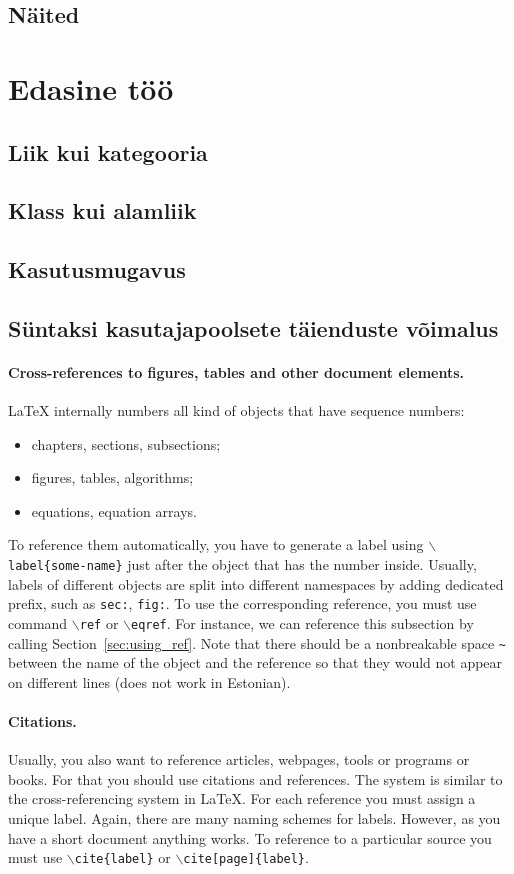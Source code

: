 \documentclass[12pt]{article}
\newcommand\peatykk[1]{
  \clearpage
  \section{#1}}
\begin{document}
    \subsection{Näited}
  \peatykk{Edasine töö}
    \subsection{Liik kui kategooria}
    \subsection{Klass kui alamliik}
    \subsection{Kasutusmugavus}
    \subsection{Süntaksi kasutajapoolsete täienduste võimalus}
\paragraph{Cross-references to figures, tables and other document elements.}
LaTeX  internally numbers all kind of objects that have sequence numbers:
\begin{itemize}
\item chapters, sections, subsections;
\item figures, tables, algorithms;
\item equations, equation arrays.
\end{itemize}
To reference them automatically, you have to generate a label using \texttt{$\backslash$label\{some-name\}} just after the object that has the number inside. Usually, labels of different objects are split into different namespaces by adding dedicated prefix, such as \texttt{sec:}, \texttt{fig:}. To use the corresponding reference, you must use command \texttt{$\backslash$ref} or \texttt{$\backslash$eqref}. For instance, we can reference this subsection by calling Section~\ref{sec:using_ref}. Note that there should be a nonbreakable space \texttt{\~} between the name of the object and the reference so that they would not appear on different lines (does not work in Estonian).          

\paragraph{Citations.}
Usually, you also want to reference articles, webpages, tools or programs or books. For that you should use citations and references. The system is similar to the cross-referencing system in LaTeX. For each reference you must assign a unique label. Again, there are many naming schemes for labels. However, as you have a short document anything works. To reference to a particular source you must use \texttt{$\backslash$cite\{label\}} or \texttt{$\backslash$cite[page]\{label\}}. 
\end{document}
